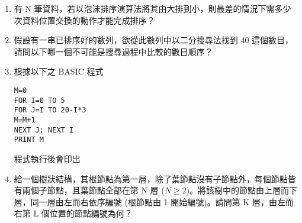 \documentclass[12pt,a4paper]{report}
\begin{document}
\begin{CJK}{UTF8}{bkai}
\begin{enumerate}
\item 有 N 筆資料，若以泡沫排序演算法將其由大排到小，則最差的情況下需多少次資料位置交換的動作才能完成排序？
\item 假設有一串已排序好的數列，欲從此數列中以二分搜尋法找到 40 這個數目，請問以下哪一個不可能是搜尋過程中比較的數目順序？
\item 根據以下之 BASIC 程式
  \begin{lstlisting}[language={[Visual]Basic}]
M=0
FOR I=0 TO 5
FOR J=I TO 20-I*3
M=M+1
NEXT J: NEXT I
PRINT M
  \end{lstlisting}
  程式執行後會印出
\item \label{north-92-p42} 給一個樹狀結構，其根節點為第一層，除了葉節點沒有子節點外，每個節點皆有兩個子節點，且葉節點全部在第 N 層 ($N\geq{2}$)。將該樹中的節點由上層而下層，同一層由左而右依序編號 (根節點由 1 開始編號)。請問第 K 層，由左而右第 L 個位置的節點編號為何？
\end{enumerate}
\end{CJK}
\end{document}
